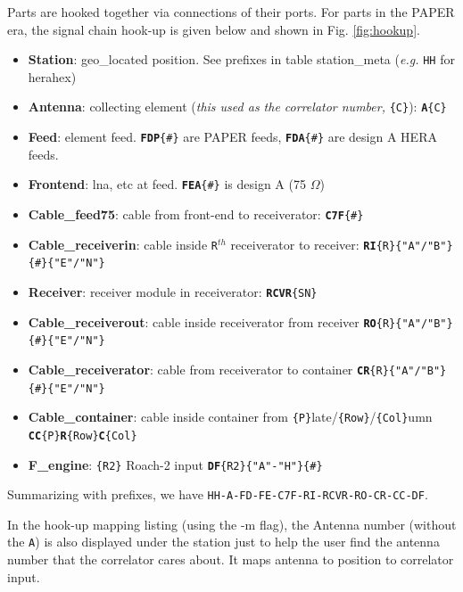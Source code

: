 \documentclass{article}
\begin{document}
Parts are hooked together via connections of their ports.   For parts in the PAPER era, the signal chain hook-up is given below and shown in Fig. \ref{fig:hookup}.
\begin{itemize}\setlength\itemsep{-.3em}
	\item {\bf Station}: geo\_located position.  See prefixes in table station\_meta ({\em e.g.} {\tt HH} for herahex)
	\item {\bf Antenna}:  collecting element ({\em this used as the correlator number,} {\tt \{C\}}):  {\tt{\bf A}\{C\}}
	\item {\bf Feed}:  element feed.  {\tt {\bf FDP}\{\#\}} are PAPER feeds, {\tt {\bf FDA}\{\#\}} are design A HERA feeds.
	\item {\bf Frontend}:  lna, etc at feed.  {\tt {\bf FEA}\{\#\}} is design A (75 $\Omega$)
	\item {\bf Cable\_feed75}:  cable from front-end to receiverator: {\tt {\bf C7F}\{\#\}}
	\item {\bf Cable\_receiverin}:  cable inside {\tt R}$^{th}$ receiverator to receiver: {\tt {\bf RI}\{R\}\{"A"/"B"\}\{\#\}\{"E"/"N"\}}
	\item {\bf Receiver}:  receiver module in receiverator: {\tt {\bf RCVR}\{SN\}}
	\item {\bf Cable\_receiverout}:  cable inside receiverator from receiver {\tt {\bf RO}\{R\}\{"A"/"B"\}\{\#\}\{"E"/"N"\}}
	\item {\bf Cable\_receiverator}:  cable from receiverator to container {\tt {\bf CR}\{R\}\{"A"/"B"\}\{\#\}\{"E"/"N"\}}
	\item {\bf Cable\_container}:  cable inside container from {\tt\{P\}}late/{\tt\{Row\}}/{\tt\{Col\}}umn {\tt {\bf CC}\{P\}{\bf R}\{Row\}{\bf C}\{Col\}}
	\item {\bf F\_engine}:  {\tt\{R2\}} Roach-2 input {\tt {\bf DF}\{R2\}\{"A"-"H"\}\{\#\}}
\end{itemize}
Summarizing with prefixes, we have {\tt HH-A-FD-FE-C7F-RI-RCVR-RO-CR-CC-DF}.

In the hook-up mapping listing (using the -m flag), the Antenna number (without the {\tt A}) is also displayed under the station just to help the user find the antenna number that the correlator cares about.  It maps antenna to position to correlator input.
\end{document}
